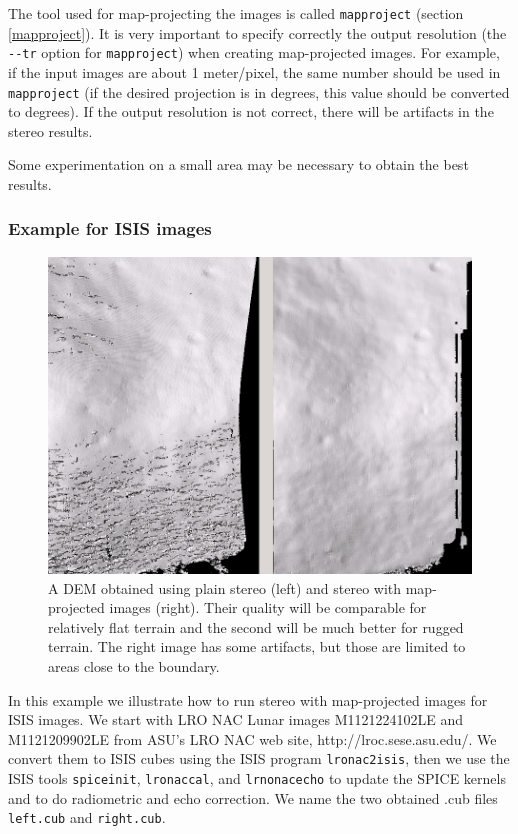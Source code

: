 The tool used for map-projecting the images is called
\texttt{mapproject} (section \ref{mapproject}). It is very important to
specify correctly the output resolution (the \texttt{-\/-tr} option for
\texttt{mapproject}) when creating map-projected images. For example, if
the input images are about 1 meter/pixel, the same number should be used
in \texttt{mapproject} (if the desired projection is in degrees, this
value should be converted to degrees). If the output resolution is not
correct, there will be artifacts in the stereo results.

Some experimentation on a small area may be necessary to obtain the best
results.

\subsubsection{Example for ISIS images}

\begin{figure}[h!]
\centering
   \includegraphics[width=6.0in]{images/stereo_mapproj.png}
\caption{A DEM obtained using plain stereo (left) and stereo
  with map-projected images (right). Their quality will be comparable
  for relatively flat terrain and the second will be much better for
  rugged terrain. The right image has some artifacts, but those are limited
  to areas close to the boundary.}
\label{fig:mapproj-example}
\end{figure}

In this example we illustrate how to run stereo with map-projected
images for ISIS images. We start with LRO NAC Lunar images M1121224102LE
and M1121209902LE from ASU's LRO NAC web site,
http://lroc.sese.asu.edu/. We convert them to ISIS cubes using the ISIS
program \texttt{lronac2isis}, then we use the ISIS tools
\texttt{spiceinit}, \texttt{lronaccal}, and \texttt{lrnonacecho} to
update the SPICE kernels and to do radiometric and echo correction. We
name the two obtained .cub files \texttt{left.cub} and
\texttt{right.cub}.

